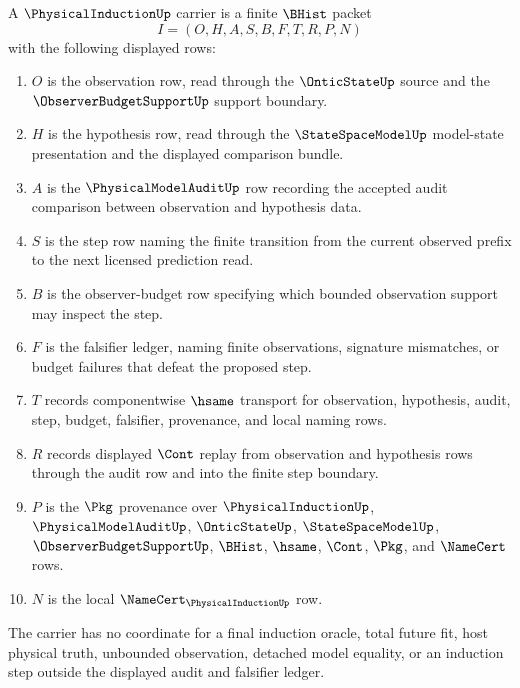 \begin{definition}
\label{def:physical-induction-carrier}
A $\PhysicalInductionUp$ carrier is a finite $\BHist$ packet
$$
I=(O,H,A,S,B,F,T,R,P,N)
$$
with the following displayed rows:
\begin{enumerate}
\item $O$ is the observation row, read through the $\OnticStateUp$ source and the $\ObserverBudgetSupportUp$ support boundary.
\item $H$ is the hypothesis row, read through the $\StateSpaceModelUp$ model-state presentation and the displayed comparison bundle.
\item $A$ is the $\PhysicalModelAuditUp$ row recording the accepted audit comparison between observation and hypothesis data.
\item $S$ is the step row naming the finite transition from the current observed prefix to the next licensed prediction read.
\item $B$ is the observer-budget row specifying which bounded observation support may inspect the step.
\item $F$ is the falsifier ledger, naming finite observations, signature mismatches, or budget failures that defeat the proposed step.
\item $T$ records componentwise $\hsame$ transport for observation, hypothesis, audit, step, budget, falsifier, provenance, and local naming rows.
\item $R$ records displayed $\Cont$ replay from observation and hypothesis rows through the audit row and into the finite step boundary.
\item $P$ is the $\Pkg$ provenance over $\PhysicalInductionUp$, $\PhysicalModelAuditUp$, $\OnticStateUp$, $\StateSpaceModelUp$, $\ObserverBudgetSupportUp$, $\BHist$, $\hsame$, $\Cont$, $\Pkg$, and $\NameCert$ rows.
\item $N$ is the local $\NameCert_{\PhysicalInductionUp}$ row.
\end{enumerate}
The carrier has no coordinate for a final induction oracle, total future fit, host physical truth, unbounded observation, detached model equality, or an induction step outside the displayed audit and falsifier ledger.
\end{definition}

